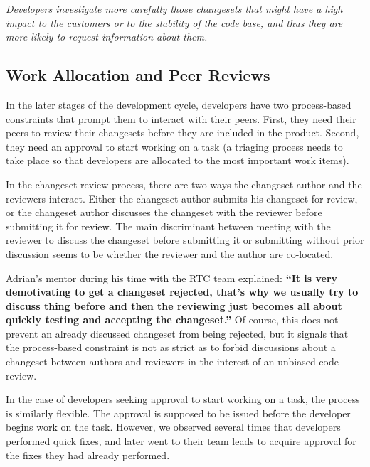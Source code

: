 \documentclass{sig-alternate}
\newenvironment{note}%
{\medskip
\noindent
\vspace{2pt}
\let\emph=\textbf
\begin{boxedminipage}{.99\columnwidth}\em}%
{\end{boxedminipage}}
\begin{document}
\begin{note}
Developers investigate more carefully those changesets that might have a high impact to the customers or to the stability of the code base, and thus they are more likely to request information about them.
\end{note}





\subsection{Work Allocation and Peer Reviews}

In the later stages of the development cycle, developers have two process-based constraints that prompt them to interact with their peers. First, they need their peers to review their changesets before they are included in the product. Second, they need an approval to start working on a task (a triaging process needs to take place so that developers are allocated to the most important work items).

In the changeset review process, there are two ways the changeset author and the reviewers interact.
Either the changeset author submits his changeset for review, or the changeset author discusses the changeset with the reviewer before submitting it for review. The main discriminant between meeting with the reviewer to discuss the changeset before submitting it or submitting without prior discussion seems to be whether the reviewer and the author are co-located.

Adrian's mentor during his time with the RTC team explained: \emph{``It is very demotivating to get a changeset rejected, that's why we usually try to discuss thing before and then the reviewing just becomes all about quickly testing and accepting the changeset.''} Of course, this does not prevent an already discussed changeset from being rejected, but it signals that the process-based constraint is not as strict as to forbid discussions about a changeset between authors and reviewers in the interest of an unbiased code review.

In the case of developers seeking approval to start working on a task, the process is similarly flexible. The approval is supposed to be issued before the developer begins work on the task. However, we observed several times that developers performed quick fixes, and later went to their team leads to acquire approval for the fixes they had already performed.
\end{document}
